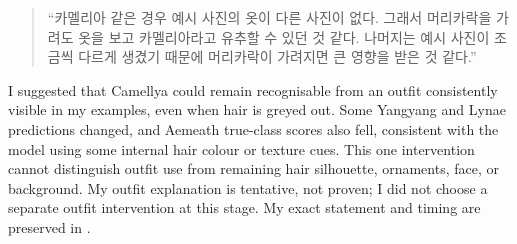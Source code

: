 \documentclass[11pt]{article}
\begin{document}
\begin{quote}
``카멜리아 같은 경우 예시 사진의 옷이 다른 사진이 없다. 그래서 머리카락을 가려도 옷을 보고 카멜리아라고 유추할 수 있던 것 같다. 나머지는 예시 사진이 조금씩 다르게 생겼기 때문에 머리카락이 가려지면 큰 영향을 받은 것 같다.''
\end{quote}

I suggested that Camellya could remain recognisable from an outfit consistently visible in my examples, even when hair is greyed out. Some Yangyang and Lynae predictions changed, and Aemeath true-class scores also fell, consistent with the model using some internal hair colour or texture cues. This one intervention cannot distinguish outfit use from remaining hair silhouette, ornaments, face, or background. My outfit explanation is tentative, not proven; I did not choose a separate outfit intervention at this stage. My exact statement and timing are preserved in .

\clearpage
\end{document}
